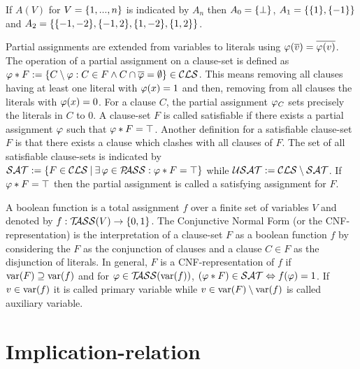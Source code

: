 \documentclass{report}
\begin{document}
\begin{examp}\label{exp:An}
If $A(V)$ for $V=\{ 1,..., n \}$ is indicated by $A_n$ then $A_0 = \{ \bot \}$, $A_1 = \{ \{ 1 \},\{ -1 \} \}$ and $A_2 = \{ \{ -1,-2 \},\{ -1,2 \},\{ 1,-2 \},\{ 1,2 \} \}$.
\end{examp}

Partial assignments are extended from variables to literals using $\varphi(\overline{v})=\overline{\varphi(v)}$. The operation of a partial assignment on a clause-set is defined as $\varphi * F := \{ C \setminus \varphi : C \in F \wedge C \cap \overline{\varphi} = \emptyset \} \in \mathcal{CLS}$. This means removing all clauses having at least one literal with $\varphi (x)=1$ and then, removing from all clauses the literals with $\varphi (x)=0$. For a clause $C$, the partial assignment $\varphi_C$ sets precisely the literals in $C$ to 0. A clause-set $F$ is called satisfiable if there exists a partial assignment $\varphi$ such that $\varphi * F = \top$. Another definition for a satisfiable clause-set $F$ is that there exists a clause which clashes with all clauses of $F$. The set of all satisfiable clause-sets is indicated by $\mathcal{SAT} := \{ F \in \mathcal{CLS} {\:|\:} \exists\, \varphi \in \mathcal{P\hspace{-0.32em}ASS} : \varphi * F = \top \}$ while $\mathcal{USAT} := \mathcal{CLS} \setminus \mathcal{SAT}$. If $\varphi * F = \top$ then the partial assignment is called a satisfying assignment for $F$.

A boolean function is a total assignment $f$ over a finite set of variables $V$ and denoted by $f:  \mathcal{T\hspace{-0.35em}ASS}(V) \rightarrow \{ 0,1 \}$. The Conjunctive Normal Form (or the CNF-representation) is the interpretation of a clause-set $F$ as a boolean function $f$ by considering the $F$ as the conjunction of clauses and a clause $C \in F$ as the disjunction of literals. In general, $F$ is a CNF-representation of $f$ if $\operatorname{var}(F) \supseteq \operatorname{var}(f)$ and for $\varphi \in \mathcal{T\hspace{-0.35em}ASS}(\operatorname{var}(f))$, $(\varphi * F) \in \mathcal{SAT} \Leftrightarrow f(\varphi) = 1$. If $v \in \operatorname{var}(f)$ it is called primary variable while $v \in \operatorname{var}(F) \setminus \operatorname{var}(f)$ is called auxiliary variable.

\section{Implication-relation}
\label{sec:imprel}
\end{document}
